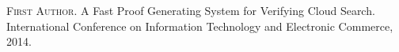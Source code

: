 
\begin{publications}{99}

    \item\textsc{First Author}. {A Fast Proof Generating System for Verifying Cloud Search}.
      International Conference on Information Technology and Electronic Commerce, 2014.

\end{publications}
